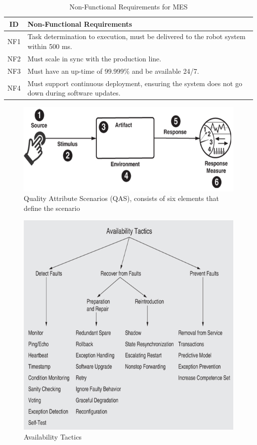 \begin{table}[hbt]
    \centering
    \caption{Non-Functional Requirements for MES}
    \label{tab:mes_nonfunctional}
    \begin{tabular}{|c|p{6cm}|}
        \hline
        \textbf{ID} & \textbf{Non-Functional Requirements} \\
        \hline
        NF1 & Task determination to execution, must be delivered to the robot system within 500 ms. \\
        \hline
        NF2 & Must scale in sync with the production line. \\
        \hline
        NF3 & Must have an up-time of 99.999\% and be available 24/7. \\
        \hline
        NF4 & Must support continuous deployment, ensuring the system does not go down during software updates. \\
        \hline
    \end{tabular}
\end{table}

\begin{figure}[hbt]
    \centering
    \caption{\centering Quality Attribute Scenarios (QAS), consists of six elements that define the scenario}
    \label{fig:qas-diagram}
    \includegraphics[width=0.93\linewidth]{images/qas.png} 
\end{figure}

\begin{figure}[hbt]
    \centering
    \caption{Availability Tactics}
    \label{fig:availability-tactics}
    \includegraphics[width=0.7\linewidth]{images/Availability tactics.png}
\end{figure}



